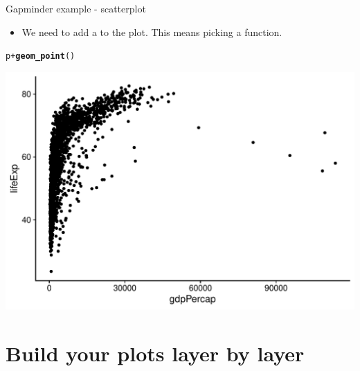 \documentclass[10pt]{beamer}\usepackage[]{graphicx}\usepackage[]{color}
\makeatletter
\def\maxwidth{ %
  \ifdim\Gin@nat@width>\linewidth
    \linewidth
  \else
    \Gin@nat@width
  \fi
}
\newcommand{\hlopt}[1]{\textcolor[rgb]{0,0,0}{#1}}%
\newcommand{\hlstd}[1]{\textcolor[rgb]{0.345,0.345,0.345}{#1}}%
\newcommand{\hlkwd}[1]{\textcolor[rgb]{0.737,0.353,0.396}{\textbf{#1}}}%
\newenvironment{kframe}{%
 \def\at@end@of@kframe{}%
 \ifinner\ifhmode%
  \def\at@end@of@kframe{\end{minipage}}%
  \begin{minipage}{\columnwidth}%
 \fi\fi%
 \def\FrameCommand##1{\hskip\@totalleftmargin \hskip-\fboxsep
 \colorbox{shadecolor}{##1}\hskip-\fboxsep
     \hskip-\linewidth \hskip-\@totalleftmargin \hskip\columnwidth}%
 \MakeFramed {\advance\hsize-\width
   \@totalleftmargin\z@ \linewidth\hsize
   \@setminipage}}%
 {\par\unskip\endMakeFramed%
 \at@end@of@kframe}
\newenvironment{knitrout}{}{} %
\makeatother
\begin{document}
\begin{frame}[fragile]{Gapminder example - scatterplot}
	
	\begin{itemize}
		\item We need to add a  to the plot. This means picking a  function.
	\end{itemize}
	

\begin{knitrout}\tiny
{}\color{fgcolor}\begin{kframe}
\begin{alltt}
\hlstd{p} \hlopt{+} \hlkwd{geom_point}\hlstd{()}
\end{alltt}
\end{kframe}

{\centering \includegraphics[width=\maxwidth]{figure/unnamed-chunk-6-1} 

}


\end{knitrout}
	
\end{frame}



\section{Build your plots layer by layer}
\end{document}
